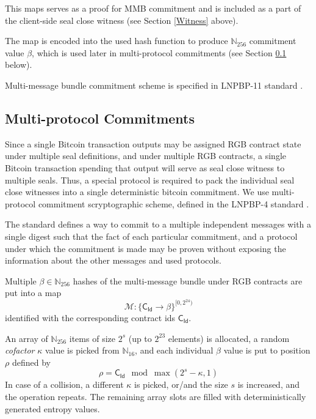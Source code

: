 \documentclass[9pt,oneside]{amsart}
\begin{document}
\begin{multicols}{2}
This maps serves as a proof for MMB commitment and is included as a part of the
client-side seal close witness (see Section \ref{Witness} above).

The map is encoded into the used hash function to produce
$\mathbb{N}_{256}$ commitment value $\beta$,
which is used later in multi-protocol commitments (see Section \ref{MPC} below).

Multi-message bundle commitment scheme is specified in LNPBP-11 standard \cite{LNPBP11}.

\subsection{Multi-protocol Commitments}\label{MPC}

Since a single Bitcoin transaction outputs may be assigned RGB contract state
under multiple seal definitions, and under multiple RGB contracts,
a single Bitcoin transaction spending that output will serve as
\gls{seal close witness} to multiple seals.
Thus, a special protocol is required to pack the individual seal close witnesses
into a single deterministic bitcoin commitment.
We use multi-protocol commitment scryptographic scheme, defined in the LNPBP-4
standard \cite{LNPBP4}.

The standard defines a way to commit to a multiple independent messages
with a single digest such that the fact of each particular commitment,
and a protocol under which the commitment is made may be proven without
exposing the information about the other messages and used protocols.

Multiple $\beta \in \mathbb{N}_{256}$ hashes of the multi-message bundle under
RGB contracts are put into a map
\noindent
\begin{equation}
\mathcal{M}: \{ \mathsf{C_{Id}} \rightarrow \beta \}^{[0, 2^{24})}
\end{equation}
\noindent
identified with the corresponding contract ids $\mathsf{C_{Id}}$.

An array of $\mathbb{N}_{256}$ items of size $2^s$ (up to $2^23$ elements) is allocated,
a random \emph{cofactor} $\kappa$ value is picked from $\mathbb{N}_{16}$,
and each individual $\beta$ value is put to position $\rho$ defined by
\noindent
\begin{equation}
    \rho = \mathsf{C_{Id}} \mod \max(2^s - \kappa, 1)
\end{equation}
\noindent
In case of a collision, a different $\kappa$ is picked,
or/and the size $s$ is increased, and the operation repeats.
The remaining array slots are filled with deterministically generated entropy values.


\end{multicols}
\end{document}
